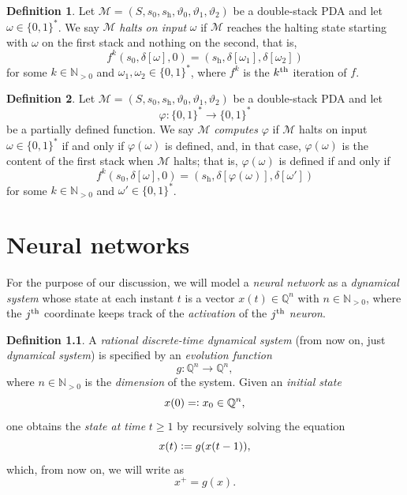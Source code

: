 \documentclass{book}
\newcommand{\defeq}{\vcentcolon=}
\newcommand{\eqdef}{=\vcentcolon}
\newcommand{\Q}{\mathbb{Q}}
\newcommand{\h}{\mathrm{h}}
\theoremstyle{definition}
\newtheorem{definition}{Definition}[chapter]
\theoremstyle{plain}
\theoremstyle{plain}
\theoremstyle{remark}
\theoremstyle{plain}
\begin{document}
	\begin{definition}
		Let $\mathcal{M}=(S,s_0,s_\h,\vartheta_0,\vartheta_1,\vartheta_2)$ be a double-stack PDA and let $\omega\in\{0,1\}^*$. We say $\mathcal{M}$ \emph{halts on input} $\omega$ if $\mathcal{M}$ reaches the halting state starting with $\omega$ on the first stack and nothing on the second, that is,
		$$
			f^k(s_0,\delta[\omega],0)=(s_\h,\delta[\omega_1],\delta[\omega_2])
		$$
		for some $k\in\mathbb{N}_{>0}$ and $\omega_1,\omega_2\in\{0,1\}^*$, where $f^k$ is the $k\textsuperscript{th}$ iteration of $f$.
	\end{definition}
		
	\begin{definition}	\label{def:computed}
		Let $\mathcal{M}=(S,s_0,s_\h,\vartheta_0,\vartheta_1,\vartheta_2)$ be a double-stack PDA and let $$\varphi:\{0,1\}^* \to \{0,1\}^*$$ be a partially defined function. We say $\mathcal{M}$ \emph{computes} $\varphi$ if $\mathcal{M}$ halts on input $\omega\in\{0,1\}^*$ if and only if $\varphi(\omega)$ is defined, and, in that case, $\varphi(\omega)$ is the content of the first stack when $\mathcal{M}$ halts; that is, $\varphi(\omega)$ is defined if and only if
		$$
			f^k(s_0,\delta[\omega],0)=(s_\h,\delta[\varphi(\omega)],\delta[\omega'])
		$$
		for some $k\in\mathbb{N}_{>0}$ and $\omega'\in\{0,1\}^*$.
	\end{definition}

	\chapter{Neural networks}
	For the purpose of our discussion, we will model a \emph{neural network} as a \emph{dynamical system} whose state at each instant $t$ is a vector $x(t) \in \Q^n$ with $n \in \mathbb{N}_{>0}$, where the $j\textsuperscript{th}$ coordinate keeps track of the \emph{activation} of the $j\textsuperscript{th}$ \emph{neuron}.
	
	\begin{definition}
		A \emph{rational discrete-time dynamical system} (from now on, just \emph{dynamical system}) is specified by an \emph{evolution function} $$g:\Q^n \to \Q^n,$$ where $n \in \mathbb{N}_{>0}$ is the \emph{dimension} of the system. Given an \emph{initial state} $$x(0) \eqdef x_0 \in \Q^n,$$ one obtains the \emph{state at time} $t \geq 1$ by recursively solving the equation $$x(t) \defeq g(x(t-1)),$$ which, from now on, we will write as $$x^+=g(x).$$
	\end{definition}
	
\end{document}
